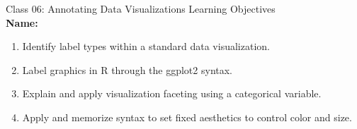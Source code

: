 \documentclass[11pt]{article}
\begin{document}
{\Large \textcolor{oiB}{
Class 06: Annotating Data Visualizations
\hfill Learning Objectives}} \\

\textbf{Name:} \underline{\hspace{6cm}} \\

\vspace{0.2cm}

\begin{enumerate}
\renewcommand\labelenumi{\textcolor{light}{\textbf{LO \theenumi.}}}

\item Identify label types within a standard data visualization.

\item Label graphics in R through the ggplot2 syntax.

\item Explain and apply visualization faceting using a categorical variable.

\item Apply and memorize syntax to set fixed aesthetics to control color and
size.

\end{enumerate}

\noindent\makebox[\linewidth]{\rule{1.1\textwidth}{0.4pt}}
\end{document}
